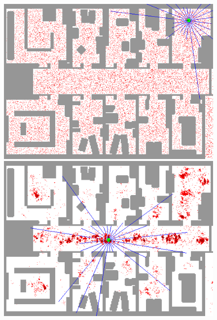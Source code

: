 \documentclass[12pt]{article}
\begin{document}
\begin{figure}[h]
    \centering
     \begin{minipage}{0.24\textwidth}
        \centering
        \includegraphics[width=\linewidth]{frame_00_delay-1s} %
    \end{minipage}
    \begin{minipage}{0.24\textwidth}
        \centering
        \includegraphics[width=\linewidth]{frame_02_delay-1s}
    \end{minipage}
    \begin{minipage}{0.24\textwidth}
        \centering

\end{minipage}
\end{figure}
\end{document}
